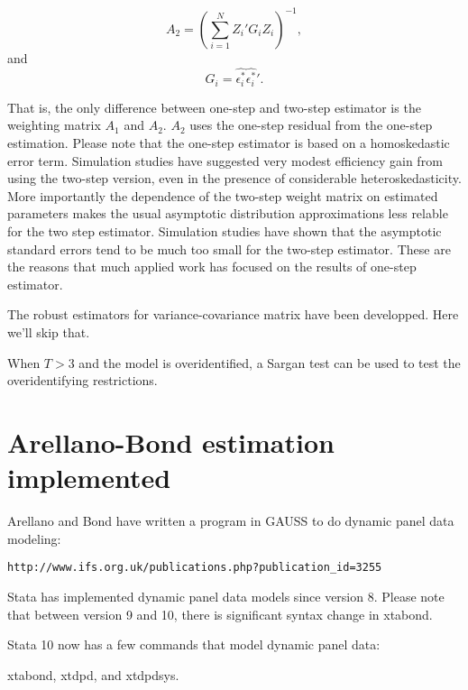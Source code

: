 \begin{equation}
A_2 =  (\sum_{i=1}^N {Z_i}' G_i Z_i)^{-1},
\end{equation}
and 
\begin{equation}
G_i = \hat {\epsilon_i^*} \hat {\epsilon_i^*}'.
\end{equation}

That is, the only difference between one-step and two-step estimator
is the weighting matrix $A_1$ and $A_2$.  $A_2$ uses the one-step
residual from the one-step estimation.  Please note that the one-step
estimator is based on a homoskedastic error term.  Simulation studies
have suggested very modest efficiency gain from using the two-step
version, even in the presence of considerable heteroskedasticity.
More importantly the dependence of the two-step weight matrix on
estimated parameters makes the usual asymptotic distribution
approximations less relable for the two step estimator.  Simulation
studies have shown that the asymptotic standard errors tend to be much
too small for the two-step estimator.  These are the reasons that much
applied work has focused on the results of one-step estimator.


The robust estimators for variance-covariance matrix have been developped.  Here we'll skip that.


When $T>3$ and the model is overidentified, a Sargan test can be used to test the overidentifying restrictions.

\section{Arellano-Bond estimation implemented}

Arellano and Bond have written a program in GAUSS to do dynamic panel data modeling:

\begin{verbatim}
http://www.ifs.org.uk/publications.php?publication_id=3255
\end{verbatim}

Stata has implemented dynamic panel data models since version 8.  Please note that between version 9 and 10, there is significant syntax change in xtabond.

Stata 10 now has a few commands that model dynamic panel data:

xtabond, xtdpd, and xtdpdsys.
